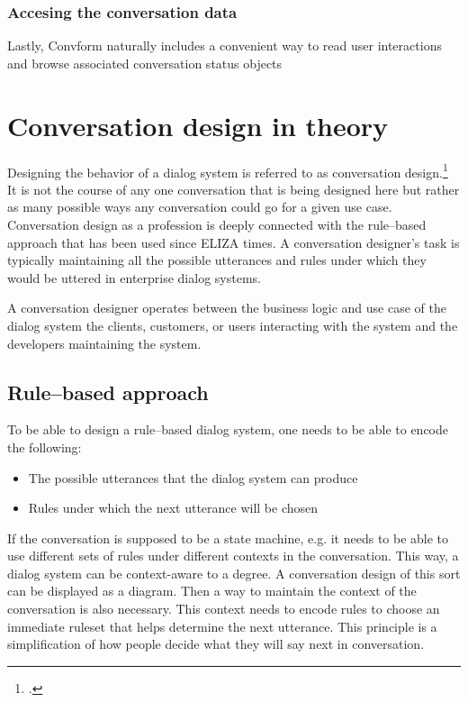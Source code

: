 \documentclass[12pt]{report}
\begin{document}
{\subsubsection{Accesing the conversation data}
Lastly, Convform naturally includes a convenient way to read user interactions
and browse associated conversation status objects

\section{Conversation design in theory}


\par
Designing the behavior of a dialog system
is referred to as conversation design.\footcite{kolosova2022,mctear2020conversational,cxd}
It is not the course of any one conversation that is being designed here
but rather as many possible ways any conversation could go
for a given use case.
Conversation design as a profession is deeply connected
with the rule–based approach that has been used since ELIZA times.
A conversation designer's task is typically maintaining all the possible utterances and
rules under which they would be uttered
in enterprise dialog systems.

A conversation designer operates between
the business logic and use case of the dialog system
the clients, customers, or users interacting with the system
and the developers maintaining the system.

\subsection{Rule–based approach}

To be able to design a rule–based dialog system,
one needs to be able to encode the following:

    \begin{itemize}

        \item
        The possible utterances that the dialog system can produce

        \item
        Rules under which the next utterance will be chosen
    \end{itemize}

\par
If the conversation is supposed to be a state machine, e.g.
it needs to be able to use different sets of rules
under different contexts in the conversation.
This way, a dialog system can be context-aware to a degree.
A conversation design of this sort
can be displayed as a diagram.
Then a way to maintain the context of the conversation is also necessary.
This context needs to encode rules to choose an immediate ruleset
that helps determine the next utterance.
This principle is a simplification of
how people decide what they will say next in conversation.

}
\end{document}
